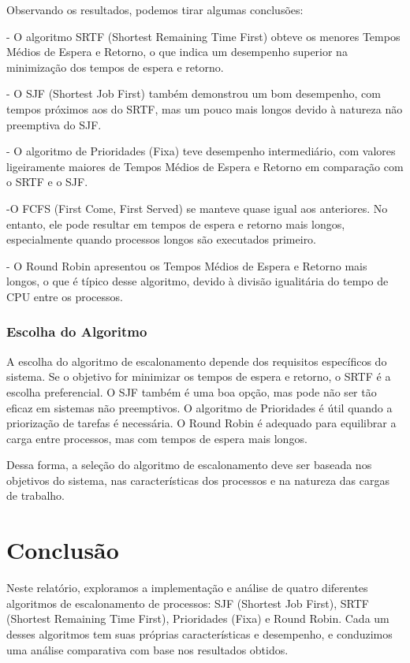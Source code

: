 \documentclass[
	12pt,				%
	openright,			%
	oneside,			%
	a4paper,			%
	chapter=TITLE,		%
	english,			%
	french,				%
	spanish,			%
	brazil				%
	]{abntex2}
\theoremstyle{definition}
\begin{document}
Observando os resultados, podemos tirar algumas conclusões:

- O algoritmo SRTF (Shortest Remaining Time First) obteve os menores Tempos Médios de Espera e Retorno, o que indica um desempenho superior na minimização dos tempos de espera e retorno.

- O SJF (Shortest Job First) também demonstrou um bom desempenho, com tempos próximos aos do SRTF, mas um pouco mais longos devido à natureza não preemptiva do SJF.

- O algoritmo de Prioridades (Fixa) teve desempenho intermediário, com valores ligeiramente maiores de Tempos Médios de Espera e Retorno em comparação com o SRTF e o SJF.

-O FCFS (First Come, First Served) se manteve quase igual aos anteriores. No entanto, ele pode resultar em tempos de espera e retorno mais longos, especialmente quando processos longos são executados primeiro.

- O Round Robin apresentou os Tempos Médios de Espera e Retorno mais longos, o que é típico desse algoritmo, devido à divisão igualitária do tempo de CPU entre os processos.

\subsection{Escolha do Algoritmo}

A escolha do algoritmo de escalonamento depende dos requisitos específicos do 
sistema. Se o objetivo for minimizar os tempos de espera e retorno, o SRTF é 
a escolha preferencial. O SJF também é uma boa opção, mas pode não ser tão 
eficaz em sistemas não preemptivos. O algoritmo de Prioridades é útil quando 
a priorização de tarefas é necessária. O Round Robin é adequado para equilibrar 
a carga entre processos, mas com tempos de espera mais longos.

Dessa forma, a seleção do algoritmo de escalonamento deve ser baseada nos 
objetivos do sistema, nas características dos processos e na natureza das 
cargas de trabalho.
    

\chapter{Conclusão}
\label{conclusao}

Neste relatório, exploramos a implementação e análise de quatro diferentes algoritmos de escalonamento de processos: SJF (Shortest Job First), SRTF (Shortest Remaining Time First), Prioridades (Fixa) e Round Robin. Cada um desses algoritmos tem suas próprias características e desempenho, e conduzimos uma análise comparativa com base nos resultados obtidos.
\end{document}
